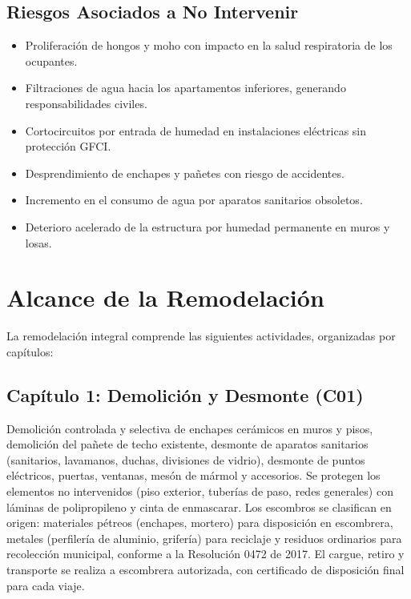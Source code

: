 ﻿\documentclass[12pt]{article}
\begin{document}
\subsection{Riesgos Asociados a No Intervenir}

\begin{itemize}[noitemsep]
  \item Proliferación de hongos y moho con impacto en la salud respiratoria de los ocupantes.
  \item Filtraciones de agua hacia los apartamentos inferiores, generando responsabilidades civiles.
  \item Cortocircuitos por entrada de humedad en instalaciones eléctricas sin protección GFCI.
  \item Desprendimiento de enchapes y pañetes con riesgo de accidentes.
  \item Incremento en el consumo de agua por aparatos sanitarios obsoletos.
  \item Deterioro acelerado de la estructura por humedad permanente en muros y losas.
\end{itemize}

\section{Alcance de la Remodelación}

La remodelación integral comprende las siguientes actividades, organizadas por capítulos:

\subsection{Capítulo 1: Demolición y Desmonte (C01)}

Demolición controlada y selectiva de enchapes cerámicos en muros y pisos,
demolición del pañete de techo existente, desmonte de aparatos sanitarios
(sanitarios, lavamanos, duchas, divisiones de vidrio), desmonte de puntos
eléctricos, puertas, ventanas, mesón de mármol y accesorios. Se protegen los
elementos no intervenidos (piso exterior, tuberías de paso, redes generales)
con láminas de polipropileno y cinta de enmascarar. Los escombros se clasifican
en origen: materiales pétreos (enchapes, mortero) para disposición en
escombrera, metales (perfilería de aluminio, grifería) para reciclaje y
residuos ordinarios para recolección municipal, conforme a la Resolución 0472
de 2017. El cargue, retiro y transporte se realiza a escombrera autorizada,
con certificado de disposición final para cada viaje.
\end{document}
